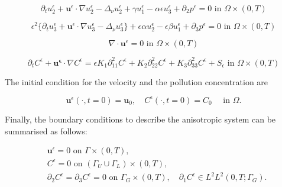 \documentclass[11pt]{article}
\begin{document}
    \begin{equation} \label{ANSC2}
    \partial_t u_2^\epsilon + \mathbf{u}^\epsilon \cdot \nabla u_2^\epsilon -\Delta_\nu u_2^\epsilon + \gamma u_1^\epsilon - \alpha \epsilon u^\epsilon_3  + \partial_2 p^\epsilon = 0 \text{ in } \Omega \times (0,T)
    \end{equation}
    
    \begin{equation} \label{ANSC3}
    \epsilon^2 \{  \partial_t u_3^\epsilon + \mathbf{u}^\epsilon \cdot \nabla u_3^\epsilon -\Delta_\nu u_3^{\epsilon} \} + \epsilon \alpha u^\epsilon_2 - \epsilon \beta u_1^\epsilon + \partial_3 p^\epsilon = 0 \text{ in } \Omega \times (0,T)
    \end{equation}
    
    \begin{equation} \label{ANSC4}
    \nabla \cdot \mathbf{u}^\epsilon= 0 \text{ in } \Omega \times (0,T)
    \end{equation}
    
    \begin{equation} \label{ANSC5}
    \partial_t C^\epsilon + \mathbf{u^\epsilon} \cdot \nabla C^\epsilon = \epsilon K_1 \partial_{11} ^ 2 C^\epsilon + K_2 \partial_{22} ^ 2 C^\epsilon + K_3 \partial_{33} ^ 2 C^\epsilon + S_\epsilon \text{ in } \Omega \times (0,T)
    \end{equation}

The initial condition for the velocity and the pollution concentration are
    
    \begin{equation} \label{ANSC7}
    \mathbf{u}^\epsilon (\cdot, t = 0) = \mathbf{u}_0, \quad C^\epsilon (\cdot, t=0) = C_0  \quad \text{ in } \Omega.
    \end{equation}
  
  Finally, the boundary conditions to describe the anisotropic system can be summarised as follows:
  
    \begin{equation} \label{ANSC8}
      \begin{split}
        & \mathbf{u}^\epsilon = 0 \text{ on } \Gamma \times (0,T), \\
        &C^\epsilon = 0 \text{ on } ( \Gamma_U \cup \Gamma_L) \times (0,T), \\
        & \partial_2 C^\epsilon = \partial_3 C^\epsilon = 0 \text{ on } \Gamma_G \times (0,T), \quad \partial_1 C^\epsilon \in L^2 L^2 (0,T; \Gamma_G). \\
      \end{split}
    \end{equation}
    
\end{document}
